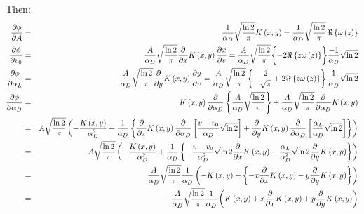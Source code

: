 \documentclass[10pt,a4paper]{report}
\begin{document}
\begin{flushleft}
Then:
\begin{eqnarray}
{{\partial \phi } \over {\partial A}} &=& {1 \over {\alpha_D}}\sqrt {{{\ln{2}}
\over \pi }}K\left( {x,y} \right)={1 \over {\alpha_D}}\sqrt {{{\ln{2}} \over
\pi }}\,\Re \left\{ {\omega \left( z \right)} \right\}\\
{{\partial \phi } \over {\partial v_0}} &=& {A \over {\alpha_D}}\sqrt {{{\ln{2}}
\over \pi }}{\partial  \over {\partial x}}K\left( {x,y} \right){{\partial x}
\over {\partial v}}={A \over {\alpha_D}}\sqrt {{{\ln{2}} \over
\pi }}\biggl\{ -2\Re \left\{ {z\omega \left( z \right)} \right\}\biggr\}{{-1} \over
{\alpha_D}}\sqrt {\ln{2}}\\
{{\partial \phi } \over {\partial \alpha_L}} &=& {A \over {\alpha_D}}\sqrt
{{{\ln{2}} \over \pi }}{\partial  \over {\partial y}}K\left( {x,y}
\right){{\partial y} \over {\partial v}}={A \over {\alpha_D}}\sqrt {{{\ln{2}}
\over \pi }}\left\{ {-{2 \over {\sqrt \pi }}+2\Im \left\{ {z\omega \left( z
\right)} \right\}} \right\}{1 \over {\alpha_D}}\sqrt {\ln{2}}\\
{{\partial \phi } \over {\partial \alpha_D}} & = & K\left( {x,y}
\right){\partial  \over {\partial \alpha_D}}\left\{ {{A \over {\alpha
_D}}\sqrt {{{\ln{2}} \over \pi }}} \right\}+{A \over {\alpha_D}}\sqrt {{{\ln{2}}
\over \pi }}{\partial  \over {\partial \alpha_D}}K\left( {x,y} \right) \nonumber\\
& = & A\sqrt {{{\ln{2}} \over \pi }}\left( {-{{K\left( {x,y} \right)} \over
{\alpha_D^2}}+{1 \over {\alpha_D}}\left\{ { {\partial \over {\partial
x}}K\left( {x,y} \right){\partial  \over {\partial \alpha_D
}}\left[ {{{v-v_0} \over {\alpha_D}}\sqrt {\ln{2}}} \right]+
{\partial \over
{\partial y}}K\left( {x,y} \right){\partial  \over {\partial \alpha
_D}}\left[ {{{\alpha _L} \over {\alpha_D}}\sqrt {\ln{2}}} \right]} \right\}}
\right) \nonumber\\
& = & A\sqrt {{{\ln{2}} \over \pi }}\left( {-{{K\left( {x,y} \right)} \over
{\alpha_D^2}}+{1 \over {\alpha_D}}\left\{ {-{{v-v_0} \over {\alpha
_D^2}}\sqrt {\ln{2}}{\partial  \over {\partial x}}K\left( {x,y}
\right)-{{\alpha_L} \over {\alpha_D^2}}\sqrt {\ln{2}}{\partial  \over
{\partial y}}K\left( {x,y} \right)} \right\}} \right) \nonumber\\ 
& = & {A \over {\alpha_D}}\sqrt {{{\ln{2}} \over \pi }}{1 \over {\alpha
_D}}\left( {-K\left( {x,y} \right)+\left\{ {-x{\partial  \over {\partial
x}}K\left( {x,y} \right)-y{\partial  \over {\partial y}}K\left( {x,y}
\right)} \right\}} \right)\nonumber\\ 
& = &  -{A \over {\alpha_D}}\sqrt {{{\ln{2}} \over \pi }}{1 \over {\alpha
_D}}\left( {K\left( {x,y} \right)+x{\partial  \over {\partial x
}}K\left( {x,y} \right)+y{\partial  \over {\partial y}}K\left( {x,y}\right)} \right) 
\end{eqnarray}



\end{flushleft}
\end{document}
